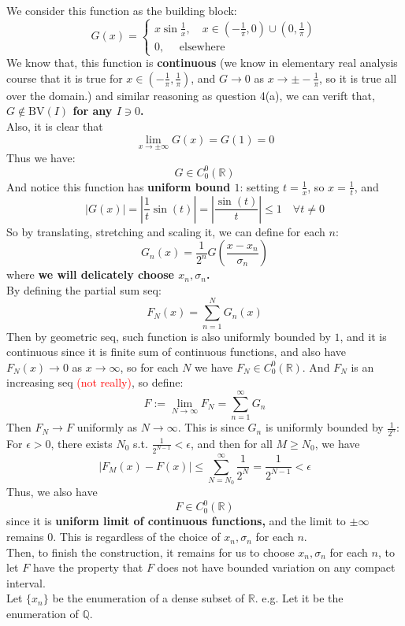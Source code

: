 \documentclass[lang=cn,11pt]{elegantbook}
\begin{document}
\begin{solution}
We consider this function as the building block:  \[
    G(x)=   \begin{cases}
        x\sin\frac1{x}    ,\quad x \in (-\frac{1}{\pi},0) \cup (0,\frac{1}{\pi})\\
        0,\quad \text{ elsewhere }
    \end{cases}
    \]
  We know that, this function is \textbf{continuous} (we know in elementary real analysis course that it is true for $x \in (-\frac{1}{\pi},\frac{1}{\pi})$, and $G \to 0$ as $x\to \pm -\frac{1}{\pi}$, so it is true all over the domain.) and similar reasoning as question 4(a), we can verift that, \textbf{$G\not\in\mathrm{BV}(I)$ for any $I \ni 0$.}\\
  Also, it is clear that \[
  \lim_{x\to \pm \infty} G(x) = G(1) = 0
  \]
Thus we have: \[
G\in C^0_0(\mathbb{R})
\]
  And notice this function has \textbf{uniform bound $1$}: setting $t=\frac{1}{x}$, so $x=\frac{1}{t}$, and
$$
|G(x)|=\left|\frac{1}{t} \sin (t)\right|=\left|\frac{\sin (t)}{t}\right| \leq 1 \quad \forall t \not = 0
$$
So by translating, stretching and scaling it, we can define for each $n$: \[
G_n(x) = \frac{1}{2^n} G(\frac{x - x_n}{\sigma_n})
\]
where \textbf{we will delicately choose $x_n,\sigma_n$.}\\
By defining the partial sum seq: \[
F_N(x) = \sum_{n=1}^N  G_n(x)
\]
Then by geometric seq, such function is also uniformly bounded by $1$, and it is continuous since it is finite sum of continuous functions, and also have $F_N(x) \to 0$ as $x\to \infty$, so for each $N$ we have $F_N \in C^0_0(\mathbb{R}) $. And $F_N$ is an increasing seq \textcolor{red}{(not really)}, so define:  \[
F := \lim_{N\to \infty} F_N = \sum_{n=1}^\infty  G_n
\]
Then $F_N \to F$ uniformly as $N\to \infty$. This is since $G_n$ is uniformly bounded by $\frac{1}{2^n}$: For $\epsilon > 0$, there exists $N_0$ s.t. $\frac{1}{2^{N-1}} < \epsilon$, and then for all $M \geq N_0$, we have \[
|F_M(x) - F(x)| \leq  \sum_{N=N_0}^\infty \frac{1}{2^N} = \frac{1}{2^{N-1}} < \epsilon
\]
Thus, we also have \[
F \in C^0_0(\mathbb{R})
\]since it is \textbf{uniform limit of continuous functions,} and the limit to $\pm\infty$ remains $0$. This is regardless of the choice of $x_n,\sigma_n$ for each $n$.\\
Then, to finish the construction, it remains for us to choose $x_n,\sigma_n$ for each $n$, to let $F$ have the property that $F$ does not have bounded variation on any compact interval.\\
Let $\{ x_n \} $ be the enumeration of a dense subset of $\mathbb{R}$. e.g. Let it be the enumeration of $\mathbb{Q}$.\\

\end{solution}
\end{document}
